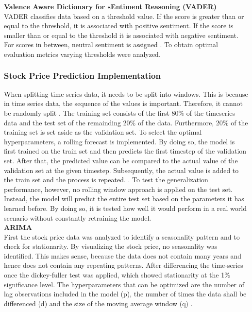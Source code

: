 \documentclass[11pt, a4paper]{article}
\begin{document}
\noindent\textbf{Valence Aware Dictionary for sEntiment Reasoning (VADER)}\\
VADER classifies data based on a threshold value.
If the score is greater than or equal to the threshold, it is associated with positive sentiment. If the score is smaller than or equal to the threshold it is associated with negative sentiment. For scores
in between, neutral sentiment is assigned \citep{hutto2015vader}. To obtain optimal evaluation metrics varying thresholds were analyzed.

\subsubsection{Stock Price Prediction Implementation}
When splitting time series data, it needs to be split into windows. This is because in time series data, the sequence of the values is important.
Therefore, it cannot be randomly split \citep{lebaron1998split}.
The training set consists of the first 80\% of the timeseries data and the test set of the remainding 20\% of the data. Furthermore, 20\% of the training set is set aside as the validation set.
To select the optimal hyperparameters, a rolling forecast is implemented. 
By doing so, the model is first trained on the train set and then predicts the first timestep of the validation set. After that, the
predicted value can be compared to the actual value of the validation set at the given timestep. Subsequently, the actual value
is added to the train set and the process is repeated. \citep{sima2018timeseries}. To test the generalization performance, however, no
rolling window approach is applied on the test set. Instead, the model will predict the entire test set based on the parameters
it has learned before. By doing so, it is tested how well it would perform in a real world scenario without constantly retraining the model.\\

\noindent\textbf{ARIMA}\\
First the stock price data was analyzed to identify a seasonality pattern and to check for stationarity.
By visualizing the stock price, no seasonality was identified. This makes sense, because the data does not contain many years and
hence does not contain any repeating patterns.
After differencing the time-series once the dickey-fuller test was applied, which showed stationarity at the 1\% significance level.
The hyperparameters that can be optimized are the number of lag observations
included in the model (p), the number of times the data shall be differenced (d) and the size of the moving average window (q) \citep{sima2018timeseries}.\\
\end{document}
